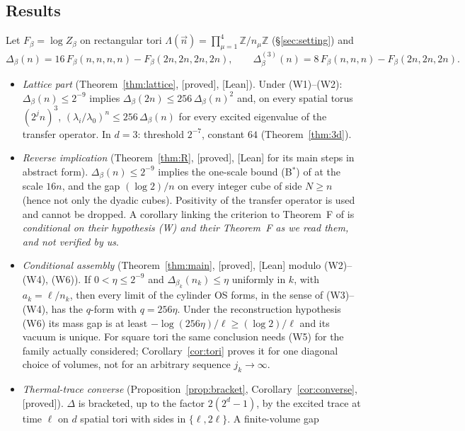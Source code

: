 \documentclass[11pt,a4paper]{article}
\theoremstyle{plain}
\theoremstyle{definition}
\theoremstyle{remark}
\numberwithin{equation}{section}
\newcommand{\Z}{\mathbb{Z}}
\newcommand{\st}[1]{\textsf{[#1]}}
\begin{document}
\subsection{Results}
Let $F_\beta=\log Z_\beta$ on rectangular tori $\Lambda(\vec n)=\prod_{\mu=1}^4\Z/n_\mu\Z$ (\S\ref{sec:setting}) and
\begin{equation}\label{eq:Delta}
\Delta_\beta(n)=16\,F_\beta(n,n,n,n)-F_\beta(2n,2n,2n,2n),\qquad
\Delta^{(3)}_\beta(n)=8\,F_\beta(n,n,n)-F_\beta(2n,2n,2n).
\end{equation}
\begin{itemize}
\item \emph{Lattice part} (Theorem~\ref{thm:lattice}, \st{proved}, \st{Lean}). Under (W1)--(W2): $\Delta_\beta(n)\le2^{-9}$ implies
$\Delta_\beta(2n)\le256\,\Delta_\beta(n)^2$ and, on every spatial torus $(2^jn)^3$, $(\lambda_i/\lambda_0)^n\le256\,\Delta_\beta(n)$ for
every excited eigenvalue of the transfer operator. In $d=3$: threshold $2^{-7}$, constant $64$ (Theorem~\ref{thm:3d}).
\item \emph{Reverse implication} (Theorem~\ref{thm:R}, \st{proved}, \st{Lean} for its main steps in abstract form). $\Delta_\beta(n)\le2^{-9}$ implies the one-scale bound (B$^*$) of \cite{BB26v5} at the scale $16n$, and the gap $(\log 2)/n$ on every integer cube of side $N\ge n$ (hence not only the dyadic cubes). Positivity of the transfer operator is used and cannot be dropped. A corollary linking the criterion to Theorem~F of \cite{BB26v5} is \emph{conditional on their hypothesis (W) and their Theorem~F as we read them, and not verified by us}.
\item \emph{Conditional assembly} (Theorem~\ref{thm:main}, \st{proved}, \st{Lean} modulo (W2)--(W4), (W6)). If $0<\eta\le2^{-9}$ and
$\Delta_{\beta_k}(n_k)\le\eta$ uniformly in $k$, with $a_k=\ell/n_k$, then every limit of the cylinder OS forms, in the sense of (W3)--(W4), has
the $q$-form with $q=256\eta$. Under the reconstruction hypothesis (W6) its mass gap is at least $-\log(256\eta)/\ell\ge(\log2)/\ell$ and its
vacuum is unique. For square tori the same conclusion needs (W5) for the family actually considered; Corollary~\ref{cor:tori} proves it for one
diagonal choice of volumes, not for an arbitrary sequence $j_k\to\infty$.
\item \emph{Thermal-trace converse} (Proposition~\ref{prop:bracket}, Corollary~\ref{cor:converse}, \st{proved}). $\Delta$ is bracketed,
up to the factor $2(2^d-1)$, by the excited trace at time $\ell$ on $d$ spatial tori with sides in $\{\ell,2\ell\}$. A finite-volume gap

\end{itemize}
\end{document}
